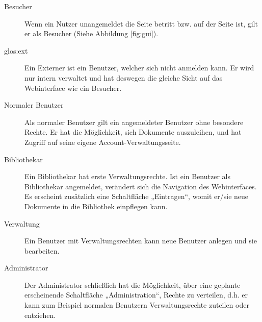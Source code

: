 \begin{description}
\item[Besucher] Wenn ein Nutzer unangemeldet die Seite betritt bzw. auf der Seite ist, gilt er als Besucher (Siehe Abbildung \ref{fig:gui}).
\item [\Gls{glos:ext}] Ein Externer ist ein Benutzer, welcher sich nicht anmelden kann. Er wird nur intern verwaltet und hat deswegen die gleiche Sicht
auf das Webinterface wie ein Besucher.
\item [Normaler Benutzer] Als normaler Benutzer gilt ein angemeldeter Benutzer ohne besondere Rechte. Er hat die Möglichkeit, sich Dokumente auszuleihen, und hat Zugriff auf seine eigene Account-Verwaltungsseite.
\item [Bibliothekar] Ein Bibliothekar hat erste Verwaltungsrechte. Ist ein Benutzer als Bibliothekar angemeldet, verändert sich die Navigation des Webinterfaces. Es erscheint zusätzlich eine Schaltfläche „Eintragen“, womit er/sie neue Dokumente in die Bibliothek einpflegen kann.
\item [Verwaltung] Ein Benutzer mit Verwaltungsrechten kann neue Benutzer anlegen und sie bearbeiten.
\item [Administrator] Der Administrator schließlich hat die Möglichkeit, über eine geplante erscheinende Schaltfläche „Administration“, Rechte zu verteilen, d.h. er kann zum Beispiel normalen Benutzern Verwaltungsrechte zuteilen oder entziehen. 
\end{description}











 
